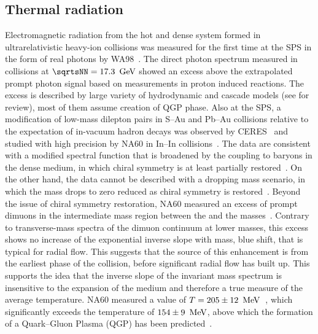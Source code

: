 \documentclass[../report.tex]{subfiles}
\begin{document}
\subsection{Thermal radiation}

Electromagnetic radiation from the hot and dense system formed in ultrarelativistic heavy-ion collisions was measured for the first time at the SPS in the form of real photons by WA98~\cite{Aggarwal:2000th}. The direct photon spectrum measured in \PbPb{} collisions at $\sqrtsNN = \unit[17.3]{\UGeV}$ showed an excess above the extrapolated prompt photon signal based on measurements in proton induced reactions. 
The excess is described by large variety of hydrodynamic and cascade models (see \cite{Peitzmann:2001mz} for review), most of them assume creation of QGP phase.
Also at the SPS, a modification of low-mass dilepton pairs in S--Au and Pb--Au collisions relative to the expectation of in-vacuum hadron decays was observed by CERES~\cite{Agakishiev:1995xb,Agakishiev:1997au,Adamova:2002kf,Agakichiev:2005ai,Adamova:2006nu} and studied with high precision by NA60 in In--In collisions~\cite{Arnaldi:2006jq,Arnaldi:2007ru,Arnaldi:2008fw,Specht:2010xu}. The data are consistent with a modified \PGr spectral function that is broadened by the coupling to baryons in the dense medium, in which chiral symmetry is at least partially restored~\cite{Rapp:1995zy,Rapp:1999us,Rapp:2009yu,Bazavov:2011nk,Hohler:2013eba}. On the other hand, the data cannot be described with a dropping mass scenario, in which the \PGr mass drops to zero reduced as chiral symmetry is restored~\cite{Brown:1991kk}. Beyond the issue of chiral symmetry restoration, NA60 measured an excess of prompt dimuons in the intermediate mass region between the \PGf and the \PJGy masses~\cite{Arnaldi:2007ru,Arnaldi:2008fw}. Contrary to transverse-mass spectra of the dimuon continuum at lower masses, this excess shows no increase of the exponential inverse slope with mass, \ie blue shift, that is typical for radial flow. This suggests that the source of this enhancement is from the earliest phase of the collision, before significant radial flow has built up. 
This supports the idea that the inverse slope of the invariant mass spectrum is insensitive to the expansion of the medium and therefore a true measure of the average temperature. NA60 measured a value of $T=\unit[205\pm12]{\UMeV}$~\cite{Specht:2010xu}, which significantly exceeds the temperature of $\unit[154\pm9]{\UMeV}$, above which the formation of a Quark--Gluon Plasma (QGP) has been predicted~\cite{Borsanyi:2010bp,Bazavov:2014pvz}.
\end{document}
